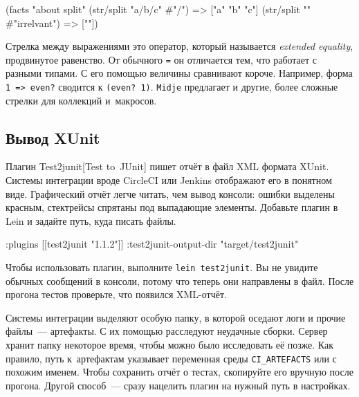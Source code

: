 \begin{english}
  \begin{clojure}
(facts "about split"
 (str/split "a/b/c" #"/") => ["a" "b" "c"]
 (str/split "" #"irrelvant") => [""])
  \end{clojure}
\end{english}


Стрелка между выражениями это оператор, который называется \emph{extended
  equality}, продвинутое равенство. От обычного \verb|=| он отличается тем, что
работает с разными типами. С его помощью величины сравнивают короче. Например,
форма \verb|1 => even?| сводится к \verb|(even? 1)|. \verb|Midje| предлагает и
другие, более сложные стрелки для коллекций и~макросов.

\subsection{Вывод XUnit}


Плагин Test2junit[Test to~JUnit] пишет отчёт
в файл XML формата XUnit. Системы интеграции вроде CircleCI или Jenkins
отображают его в понятном виде. Графический отчёт легче читать, чем вывод
консоли: ошибки выделены красным, стектрейсы спрятаны под выпадающие
элементы. Добавьте плагин в Lein и задайте путь, куда писать файлы.

\begin{english}
  \begin{clojure}
:plugins [[test2junit "1.1.2"]]
:test2junit-output-dir "target/test2junit"
  \end{clojure}
\end{english}

Чтобы использовать плагин, выполните \verb|lein test2junit|. Вы не увидите
обычных сообщений в консоли, потому что теперь они направлены в файл. После
прогона тестов проверьте, что появился XML-отчёт.

Системы интеграции выделяют особую папку, в которой оседают логи и прочие
файлы~--- артефакты. С их помощью расследуют неудачные сборки. Сервер хранит
папку некоторое время, чтобы можно было исследовать её позже. Как правило, путь
к~артефактам указывает переменная среды \verb|CI_ARTEFACTS| или с похожим
именем. Чтобы сохранить отчёт о тестах, скопируйте его вручную после
прогона. Другой способ~--- сразу нацелить плагин на нужный путь в настройках.

